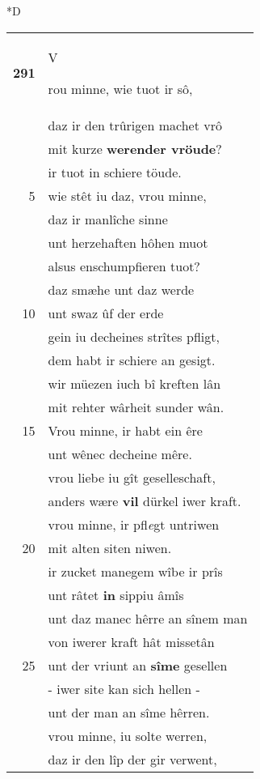 \documentclass[8pt,a4paper,notitlepage]{article}
\begin{document}
\begin{table}[ht]
\begin{minipage}[t]{0.5\linewidth}
\small
\begin{center}*D
\end{center}
\begin{tabular}{rl}
\textbf{291} & \begin{large}V\end{large}rou minne, wie tuot ir sô,\\ 
 & daz ir den trûrigen machet vrô\\ 
 & mit kurze \textbf{werender vröude}?\\ 
 & ir tuot in schiere töude.\\ 
5 & wie stêt iu daz, vrou minne,\\ 
 & daz ir manlîche sinne\\ 
 & unt herzehaften hôhen muot\\ 
 & alsus enschumpfieren tuot?\\ 
 & daz smæhe unt daz werde\\ 
10 & unt swaz ûf der erde\\ 
 & gein iu decheines strîtes pfligt,\\ 
 & dem habt ir schiere an gesigt.\\ 
 & wir müezen iuch bî kreften lân\\ 
 & mit rehter wârheit sunder wân.\\ 
15 & Vrou minne, ir habt ein êre\\ 
 & unt wênec decheine mêre.\\ 
 & vrou liebe iu gît geselleschaft,\\ 
 & anders wære \textbf{vil} dürkel iwer kraft.\\ 
 & vrou minne, ir pfl\textit{e}gt untriwen\\ 
20 & mit alten siten niwen.\\ 
 & ir zucket manegem wîbe ir prîs\\ 
 & unt râtet \textbf{in} sippiu âmîs\\ 
 & unt daz manec hêrre an sînem man\\ 
 & von iwerer kraft hât missetân\\ 
25 & unt der vriunt an \textbf{sîme} gesellen\\ 
 & - iwer site kan sich hellen -\\ 
 & unt der man an sîme hêrren.\\ 
 & vrou minne, iu solte werren,\\ 
 & daz ir den lîp der gir verwent,\\ 

\end{tabular}
\end{minipage}
\end{table}
\end{document}
